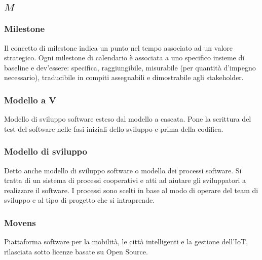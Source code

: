 \subsection*{\quad$M\quad$}

\subsubsection*{Milestone}
Il concetto di milestone indica un punto nel tempo associato ad un valore strategico. Ogni milestone di calendario è associata a uno specifico insieme di baseline e dev’essere: specifica, raggiungibile, misurabile (per quantità d’impegno necessario), traducibile in compiti assegnabili e dimostrabile agli stakeholder\glosp.

\subsubsection*{Modello a V}
Modello di sviluppo software esteso dal modello a cascata. Pone la scrittura del test del software nelle fasi iniziali dello sviluppo e prima della codifica.

\subsubsection*{Modello di sviluppo}
Detto anche modello di sviluppo software o modello dei processi software. Si tratta di un sistema di processi cooperativi e atti ad aiutare gli sviluppatori a realizzare il software. I processi sono scelti in base al modo di operare del team di sviluppo e al tipo di progetto che si intraprende.

\subsubsection*{Movens}
Piattaforma software per la mobilità, le città intelligenti e la gestione dell'IoT, rilasciata sotto licenze basate su Open Source.
